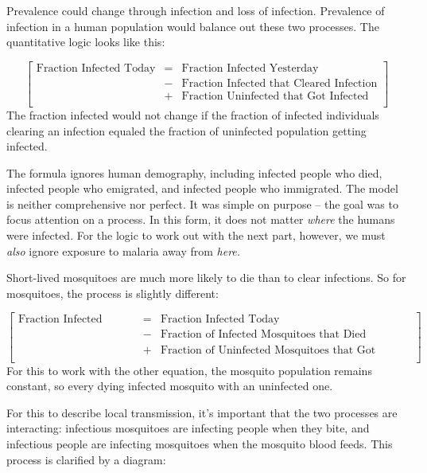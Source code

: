 \documentclass[
]{book}
\begin{document}
Prevalence could change through infection and loss of infection. Prevalence of infection in a human population would balance out these two processes. The quantitative logic looks like this:

\[
\left[
\begin{array}{rcl}
\mbox{Fraction Infected Today} &=& \mbox{Fraction Infected Yesterday} \;\; \\
&-& \mbox{Fraction Infected that Cleared Infection}\\
&+& \mbox{Fraction Uninfected that Got Infected}\\
\end{array} \right]
\]
The fraction infected would not change if the fraction of infected individuals clearing an infection equaled the fraction of uninfected population getting infected.

The formula ignores human demography, including infected people who died, infected people who emigrated, and infected people who immigrated. The model is neither comprehensive nor perfect. It was simple on purpose -- the goal was to focus attention on a process.
In this form, it does not matter \emph{where} the humans were infected.
For the logic to work out with the next part, however, we must \emph{also} ignore exposure to malaria away from \emph{here.}

Short-lived mosquitoes are much more likely to die than to clear infections. So for mosquitoes, the process is slightly different:

\[
\left[
\begin{array}{rcl}
\mbox{Fraction Infected Today} &=& \mbox{Fraction Infected Today} \\
&-&\mbox{Fraction of Infected Mosquitoes that Died}\\
&+&\mbox{Fraction of Uninfected Mosquitoes that Got Infected}\\
\end{array} \right]
\]
For this to work with the other equation, the mosquito population remains constant, so every dying infected mosquito with an uninfected one.

For this to describe local transmission, it's important that the two processes are interacting: infectious mosquitoes are infecting people when they bite, and infectious people are infecting mosquitoes when the mosquito blood feeds. This process is clarified by a diagram:
\end{document}
